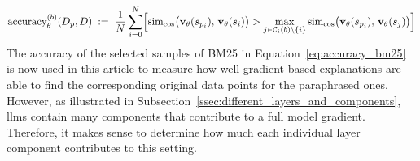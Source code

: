 \begin{equation}
\operatorname{accuracy}^{(b)}_{\theta}(D_{p},D)
\;:=\;
\frac{1}{N}\sum_{i=0}^{N}
\Bigl[
  \operatorname{sim}_{\cos}\bigl(\mathbf{v}_{\theta}(s_{p_i}),\,\mathbf{v}_{\theta}(s_i)\bigr)
  >
  \max_{j\in\mathcal{C}_{i}(b)\setminus\{i\}}
  \operatorname{sim}_{\cos}\bigl(\mathbf{v}_{\theta}(s_{p_i}),\,\mathbf{v}_{\theta}(s_j)\bigr)
\Bigr]
\label{eq:accuracy_bm25}
\end{equation}
The accuracy of the selected samples of BM25 in Equation~\ref{eq:accuracy_bm25} is now used in this article to measure how well gradient-based explanations are able to find the corresponding original data points for the paraphrased ones. However, as illustrated in Subsection~\ref{ssec:different_layers_and_components}, \acrshort{llm}s contain many components that contribute to a full model gradient. Therefore, it makes sense to determine how much each individual layer component contributes to this setting. 

